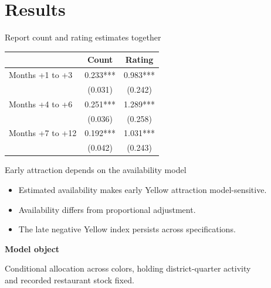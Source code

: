 \documentclass[aspectratio=169,11pt]{beamer}
\begin{document}
\section{Results}
\begin{frame}{Report count and rating estimates together}
\begin{center}
\renewcommand{\arraystretch}{1.02}
\setlength{\tabcolsep}{34pt}
\begin{tabular}{lcc}
\toprule
 & \textbf{Count} & \textbf{Rating} \\
\midrule
Months +1 to +3 & 0.233*** & 0.983*** \\
 & (0.031) & (0.242) \\[0.18cm]
Months +4 to +6 & 0.251*** & 1.289*** \\
 & (0.036) & (0.258) \\[0.18cm]
Months +7 to +12 & 0.192*** & 1.031*** \\
 & (0.042) & (0.243) \\
\bottomrule
\end{tabular}
\end{center}
\end{frame}

\begin{frame}{Early attraction depends on the availability model}
\begin{itemize}\setlength{\itemsep}{0.45cm}
  \item Estimated availability makes early Yellow attraction model-sensitive.
  \item Availability differs from proportional adjustment.
  \item The late negative Yellow index persists across specifications.
\end{itemize}
\vspace{0.55cm}
\begin{PMtakeaway}
\textbf{Model object}\par\vspace{0.2cm}
Conditional allocation across colors, holding district-quarter activity\\
and recorded restaurant stock fixed.
\end{PMtakeaway}
\end{frame}
\end{document}
